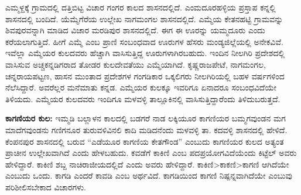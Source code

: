 ಎಮ್ಮಳ್ದಕ್ಕೆ ಗ್ರಾಮದಲ್ಲಿ ದತ್ತಿಬಿಟ್ಟ ವಿಚಾರ ಗಂಗರ ಕಾಲದ ಶಾಸನದಲ್ಲಿದೆ. ಎಂಮದೂರಹಳ್ಳಿಯ ಪ್ರಸ್ತಾಪ ಕನ್ನಲ್ಲಿ ಶಾಸನದಲ್ಲಿ ಬಂದಿದೆ. ಯೆಮ್ಮೆಗೆರೆಯ ಉಲ್ಲೇಖ ನಾಗಮಂಗಲ ಶಾಸನದಲ್ಲಿದೆ. ಎಮ್ಮೆಯ ಕೇತನಹಟ್ಟಿ ಗ್ರಾಮವನ್ನು ಶಿವಪುರವನ್ನಾಗಿ ಮಾಡಿದ ವಿಚಾರ ಮರಡಿಪುರ ಶಾಸನದಲ್ಲಿದೆ. ಈಗ ಈ ಊರನ್ನು ಯಮ್ಮದೂರು ಎಂದು ಕರೆಯಲಾಗುತ್ತಿದೆ. ಹೀಗೆ ಎಮ್ಮೆ ಎಂಬ ಪ್ರಾಣಿ ಸಂಬಂಧವಾದ ಊರುಗಳ ಹೆಸರು ಮಂಡ್ಯಜಿಲ್ಲೆಯಲ್ಲಿ ಅನೇಕವಿವೆ. ಇವೆಲ್ಲಾ ಎಮ್ಮೆಯರ ಕುಲದವರು ಹೆಚ್ಚಾಗಿ ವಾಸಿಸುತ್ತಿದ್ದ ಊರುಗಳಾಗಿರಬಹುದು. ಇಂದಿನ ನೀಲಗಿರಿ ಪ್ರದೇಶದಲ್ಲಿ ವಾಸಿಸುವ ಅಚ್ಚಕನ್ನಡಿಗರಾದ ತೋಡರ ಕುಲದೇವತೆಯು ಎಮ್ಮೆಯಾಗಿದೆ. ಕೃಷ್ಣರಾಜಪೇಟೆ, ನಾಗಮಂಗಲ, ಚನ್ನರಾಯಪಟ್ಟಣ, ಹಾಸನ ಮುಂತಾದ ಪ್ರದೇಶಗಳ ಗಂಗಡಿಕಾರ ಒಕ್ಕಲಿಗರು ನೀಲಗಿರಿಯಲ್ಲಿ ಬಹಳ ವರ್ಷಗಳಿಂದ ನೆಲೆಸಿದ್ದಾರೆ. ಅವರೆಲ್ಲರ ಮನೆಮಾತು ಕನ್ನಡ. ಎಮ್ಮೆಯರ ಕುಲಕ್ಕೂ ಇವರಿಗೂ ಏನಾದರೂ ಸಂಬಂಧವಿದೆಯೇ ತಿಳಿಯದು. ಎಮ್ಮೆಯರ ಕುಲದವರು ಇಂದಿಗೂ ಮಳವಳ್ಳಿ ತಾಲ್ಲೂಕಿನಲ್ಲಿ ವಾಸಿಸುತ್ತಿದ್ದಾರೆಂದು ತಿಳಿದುಬರುತ್ತದೆ.

\textbf{ಕಾಗಣಿಯರ ಕುಲ:} ಇಮ್ಮಡಿ ಬಲ್ಲಾಳನ ಕಾಲದಲ್ಲಿ ಬಡಗರೆ ನಾಡ ಲಕ್ಕಿಯೂರ ಕಾಗಣಿಯರ ಬಮ್ಮಗವುಂಡನ ಮಗ ಮಾದೆಗವುಂಡನು ಗಣಿಗನೂರ ತುರುವಳಿವಿನಲಿ ಕಾದಿ ಮಡಿದನೆಂದು ಮಳವಳ್ಳಿ ತಾ. ಕದವಳ್ಳಿ ಶಾಸನದಲ್ಲಿ ಹೇಳಿದೆ. ಕೆಂಪನಪುರ ಶಾಸನದಲ್ಲಿ ಬರುವ “ಎಡೆಯೂರ ಕಾಗಣಿಯ ಕೇತಗೌಂಡ” ಎಂಬುದು ಕಾಗಣಿಯರ ಕುಲದ ಅತ್ಯಂತ ಪ್ರಾಚೀನ ಉಲ್ಲೇಖವಾಗಿದೆ ಎಂದು ಹೇಳಬಹುದು. ಕವಡೆಗೆ ಕಾಕಿಣಿ ಎಂಬ ಪದಪ್ರಯೋಗವಿದೆಯೆಂದು ಕಿಟ್ಟೆಲ್​ ಅವರು ಹೇಳಿದ್ದಾರೆ. ಕಾಕಿಣಿ ಶಬ್ದ ನಾಚಿರಾಜೀಯದಲ್ಲಿದೆ ಎಂದು ಅವರು ಹೇಳಿದ್ದಾರೆ. ಕಾಕಿಣಿ\textgreater ಕಾಕಣಿ\textgreater ಕಾಗಣಿ ಆಗಿದೆಯೇ ಎಂಬುದು ಒಂದು. ಕಾಗಡಿ ಎಂದರೆ ಕಾವಡಿ ಎಂಬ ಅರ್ಥವಿದೆ. ಕಾಗಡಿಯಿಂದ ಕಾಗಣಿ ನಿಷ್ಪನ್ನವಾಗಿದೆಯೇ ಎಂಬುವು ಪರಿಶೀಲಿಸಬೇಕಾದ ವಿಚಾರಗಳು.

\vskip 3pt

